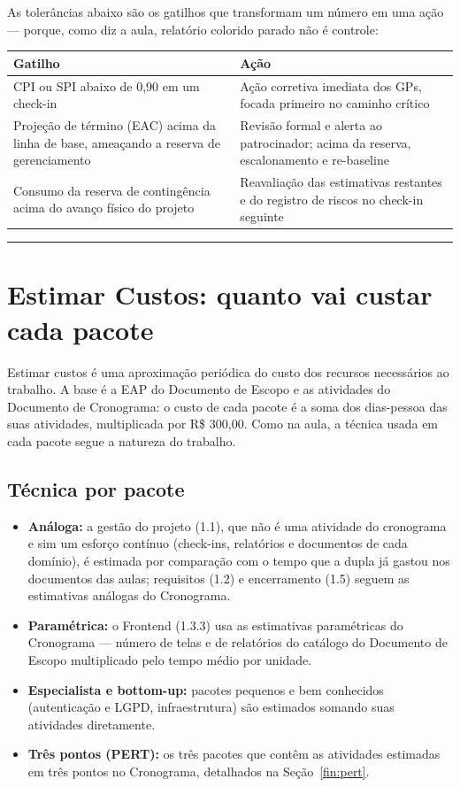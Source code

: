 \documentclass[11pt,a4paper]{article}
\newcommand{\separador}{\par\vspace{2mm}\hrule\vspace{4mm}}
\begin{document}
\noindent As tolerâncias abaixo são os gatilhos que transformam um número em uma ação --- porque, como diz a aula, relatório colorido parado não é controle:
\begin{center}
\begin{tabularx}{\textwidth}{L L}
\toprule
\textbf{Gatilho} & \textbf{Ação} \\
\midrule
CPI ou SPI abaixo de 0,90 em um check-in & Ação corretiva imediata dos GPs, focada primeiro no caminho crítico \\
Projeção de término (EAC) acima da linha de base, ameaçando a reserva de gerenciamento & Revisão formal e alerta ao patrocinador; acima da reserva, escalonamento e re-baseline \\
Consumo da reserva de contingência acima do avanço físico do projeto & Reavaliação das estimativas restantes e do registro de riscos no check-in seguinte \\
\bottomrule
\end{tabularx}
\end{center}

\separador

\section{Estimar Custos: quanto vai custar cada pacote}\label{fin:estimar}

\noindent Estimar custos é uma aproximação periódica do custo dos recursos necessários ao trabalho. A base é a EAP do Documento de Escopo e as atividades do Documento de Cronograma: o custo de cada pacote é a soma dos dias-pessoa das suas atividades, multiplicada por R\$ 300,00. Como na aula, a técnica usada em cada pacote segue a natureza do trabalho.

\subsection{Técnica por pacote}
\begin{itemize}[itemsep=3pt]
  \item \textbf{Análoga:} a gestão do projeto (1.1), que não é uma atividade do cronograma e sim um esforço contínuo (check-ins, relatórios e documentos de cada domínio), é estimada por comparação com o tempo que a dupla já gastou nos documentos das aulas; requisitos (1.2) e encerramento (1.5) seguem as estimativas análogas do Cronograma.
  \item \textbf{Paramétrica:} o Frontend (1.3.3) usa as estimativas paramétricas do Cronograma --- número de telas e de relatórios do catálogo do Documento de Escopo multiplicado pelo tempo médio por unidade.
  \item \textbf{Especialista e bottom-up:} pacotes pequenos e bem conhecidos (autenticação e LGPD, infraestrutura) são estimados somando suas atividades diretamente.
  \item \textbf{Três pontos (PERT):} os três pacotes que contêm as atividades estimadas em três pontos no Cronograma, detalhados na Seção~\ref{fin:pert}.
\end{itemize}
\end{document}
